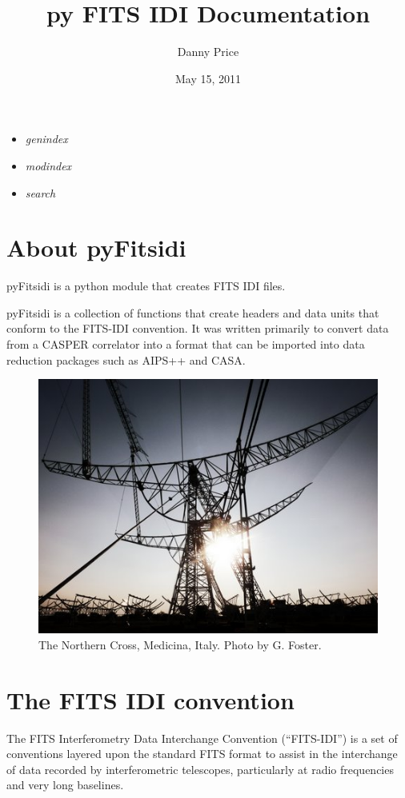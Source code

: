 \documentclass[letterpaper,10pt,english]{sphinxmanual}
\title{py FITS IDI Documentation}
\date{May 15, 2011}
\author{Danny Price}
\begin{document}
\maketitle
\tableofcontents
{}\label{index::doc}

\begin{itemize}
\item {} 
\emph{genindex}

\item {} 
\emph{modindex}

\item {} 
\emph{search}

\end{itemize}


\chapter{About pyFitsidi}
\label{index:about-pyfitsidi}\label{index:welcome-to-pyfitsidi}
pyFitsidi is a python module that creates FITS IDI files.

pyFitsidi is a collection of functions that create headers and data units that conform to the FITS-IDI convention. It was written primarily to convert data from a CASPER correlator into a format that can be imported into data reduction packages such as AIPS++ and CASA.
\begin{figure}[htbp]
\centering
\capstart

\includegraphics{medicina.jpg}
\caption{The Northern Cross, Medicina, Italy. Photo by G. Foster.}\end{figure}


\chapter{The FITS IDI convention}
\label{index:the-fits-idi-convention}
The FITS Interferometry Data Interchange Convention (“FITS-IDI”) is a set of conventions layered upon the standard FITS format to assist in the interchange of data recorded by interferometric telescopes, particularly at radio frequencies and very long baselines.
\end{document}

